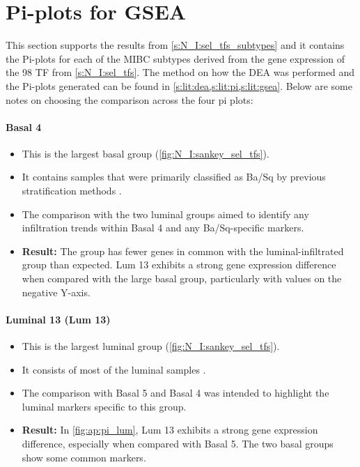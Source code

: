 \section{Pi-plots for GSEA} \label{s:ap:sel_prun_pi}

This section supports the results from \cref{s:N_I:sel_tfs_subtypes} and it contains the Pi-plots for each of the MIBC subtypes derived from the gene expression of the 98 TF from \cref{s:N_I:sel_tfs}. The method on how the DEA was performed and the Pi-plots generated can be found in \cref{s:lit:dea,s:lit:pi,s:lit:gsea}. Below are some notes on choosing the comparison across the four pi plots:

\paragraph*{Basal 4}

\begin{itemize}
    \item This is the largest basal group (\cref{fig:N_I:sankey_sel_tfs}).
    \item It contains samples that were primarily classified as Ba/Sq by previous stratification methods \citep{Robertson2017-mg,Kamoun2020-tj,Marzouka2018-ge}.
    \item The comparison with the two luminal groups aimed to identify any infiltration trends within Basal 4 and any Ba/Sq-specific markers.
    \item \textbf{Result:} The group has fewer genes in common with the luminal-infiltrated group than expected. Lum 13 exhibits a strong gene expression difference when compared with the large basal group, particularly with values on the negative Y-axis.
\end{itemize}
    
\paragraph*{Luminal 13 (Lum 13)}

\begin{itemize}
    \item This is the largest luminal group (\cref{fig:N_I:sankey_sel_tfs}).
    \item It consists of most of the luminal samples \citep{Robertson2017-mg,Kamoun2020-tj,Marzouka2018-ge}.
    \item The comparison with Basal 5 and Basal 4 was intended to highlight the luminal markers specific to this group.
    \item \textbf{Result:} In \cref{fig:ap:pi_lum}, Lum 13 exhibits a strong gene expression difference, especially when compared with Basal 5. The two basal groups show some common markers.
\end{itemize}

